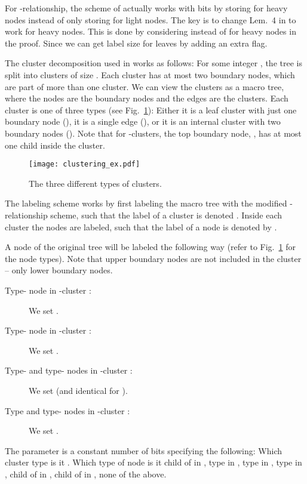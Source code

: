 \documentclass{llncs}
\begin{document}
For -relationship, the scheme of \cite{Alstrup05} actually works with
 bits by storing  for heavy
nodes instead of only storing  for light nodes.
The key is to change Lem.~4 in \cite{Alstrup05} to work for heavy nodes. This
is done by considering  instead of  for heavy nodes
in the proof. Since
 we can get label size  for leaves by
adding an extra flag.

The cluster decomposition used in \cite{Alstrup02} works as follows: For some
integer , the tree  is split into  clusters of size . Each
cluster has at most two boundary nodes, which are part of more than one
cluster. We can view the clusters as a macro tree, where the nodes are the
boundary nodes and the edges are the clusters. Each cluster is one of three
types (see Fig.~\ref{fig:cluster_ex}): Either it is a leaf cluster
with just one boundary node (), it is a single edge (), or it is
an internal cluster with two boundary nodes (). Note that for
-clusters, the top boundary node, , has at most one child inside the
cluster.

\begin{figure}[htbp]
    \centering
    \texttt{[image: clustering\_ex.pdf]}
    \caption{The three different types of clusters.}
    \label{fig:cluster_ex}
\end{figure}

The labeling scheme works by first labeling the macro tree with the modified
-relationship scheme, such that the label of a cluster  is denoted
. Inside each cluster the nodes are labeled, such that the label of a
node  is denoted by .

A node  of the original tree  will be labeled the following way (refer to
Fig.~\ref{fig:cluster_ex} for the node types). Note that upper boundary nodes
 are not included in the cluster -- only lower boundary nodes.
\begin{description}
    \item [Type- node in -cluster :] We set .
    \item [Type- node in -cluster :] We set .
    \item [Type- and type- nodes in -cluster :] We set
         (and identical for ).
    \item [Type  and type- nodes in -cluster :] We set
        .
\end{description}

The  parameter is a constant number of bits specifying the following:
Which cluster type is it . Which type of node is it
child of  in , type  in , type  in ,
type  in , child of  in , child of  in
, none of the above.
\end{document}
